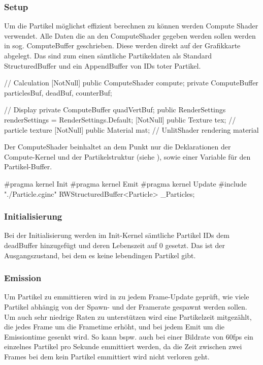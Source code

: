 \subsubsection{Setup}

Um die Partikel möglichst effizient berechnen zu können werden Compute Shader verwendet. Alle Daten die an den ComputeShader gegeben werden sollen werden in sog. ComputeBuffer geschrieben. Diese werden direkt auf der Grafikkarte abgelegt. Das sind zum einen sämtliche Partikeldaten als Standard StructuredBuffer und ein AppendBuffer von IDs toter Partikel.

\begin{csh}[caption=Controller Setup,label=lst:partSetup]
// Calculation
[NotNull] public ComputeShader compute;
private ComputeBuffer particlesBuf, deadBuf, counterBuf;

// Display
private ComputeBuffer quadVertBuf;
public RenderSettings renderSettings = RenderSettings.Default;
[NotNull] public Texture tex;  // particle texture
[NotNull] public Material mat; // UnlitShader rendering material
\end{csh}

Der ComputeShader beinhaltet an dem Punkt nur die Deklarationen der Compute-Kernel und der Partikelstruktur (siehe ), sowie einer Variable für den Partikel-Buffer.

\begin{hlsl}[caption=Compute Setup]
#pragma kernel Init
#pragma kernel Emit
#pragma kernel Update
#include "./Particle.cginc"
RWStructuredBuffer<Particle> _Particles;
\end{hlsl}

\subsubsection{Initialisierung}

Bei der Initialisierung werden im Init-Kernel sämtliche Partikel IDs dem deadBuffer hinzugefügt und deren Lebenszeit auf 0 gesetzt. Das ist der Ausgangszustand, bei dem es keine lebendingen Partikel gibt.

\subsubsection{Emission}

Um Partikel zu emmittieren wird in zu jedem Frame-Update geprüft, wie viele Partikel abhängig von der Spawn- und der Framerate gespawnt werden sollen. Um auch sehr niedrige Raten zu unterstützen wird eine Partikelzeit mitgezählt, die jedes Frame um die Frametime erhöht, und bei jedem Emit um die Emissiontime gesenkt wird. So kann bspw. auch bei einer Bildrate von 60fps ein einzelnes Partikel pro Sekunde emmittiert werden, da die Zeit zwischen zwei Frames bei dem kein Partikel emmittiert wird nicht verloren geht.

